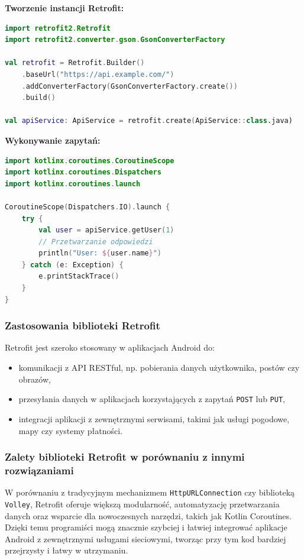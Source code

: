 \documentclass[12pt]{article}
\begin{document}
\textbf{Tworzenie instancji Retrofit:}
\begin{lstlisting}[language=Kotlin]
import retrofit2.Retrofit
import retrofit2.converter.gson.GsonConverterFactory

val retrofit = Retrofit.Builder()
	.baseUrl("https://api.example.com/")
	.addConverterFactory(GsonConverterFactory.create())
	.build()

val apiService: ApiService = retrofit.create(ApiService::class.java)
\end{lstlisting}

\textbf{Wykonywanie zapytań:}
\begin{lstlisting}[language=Kotlin]
import kotlinx.coroutines.CoroutineScope
import kotlinx.coroutines.Dispatchers
import kotlinx.coroutines.launch

CoroutineScope(Dispatchers.IO).launch {
	try {
		val user = apiService.getUser(1)
		// Przetwarzanie odpowiedzi
		println("User: ${user.name}")
	} catch (e: Exception) {
		e.printStackTrace()
	}
}
\end{lstlisting}

\subsubsection*{Zastosowania biblioteki Retrofit}
\noindent Retrofit jest szeroko stosowany w aplikacjach Android do:
\begin{itemize}
    \item komunikacji z API RESTful, np. pobierania danych użytkownika, postów czy obrazów,
    \item przesyłania danych w aplikacjach korzystających z zapytań \texttt{POST} lub \texttt{PUT},
    \item integracji aplikacji z zewnętrznymi serwisami, takimi jak usługi pogodowe, mapy czy systemy płatności.
\end{itemize}

\subsubsection*{Zalety biblioteki Retrofit w porównaniu z innymi rozwiązaniami}
\noindent W porównaniu z tradycyjnym mechanizmem \texttt{HttpURLConnection} czy biblioteką \texttt{Volley}, Retrofit oferuje większą modularność,
automatyzację przetwarzania danych oraz wsparcie dla nowoczesnych narzędzi, takich jak Kotlin Coroutines. Dzięki temu programiści mogą znacznie szybciej
i łatwiej integrować aplikacje Android z zewnętrznymi usługami sieciowymi, tworząc przy tym kod bardziej przejrzysty i łatwy w utrzymaniu.
\end{document}
